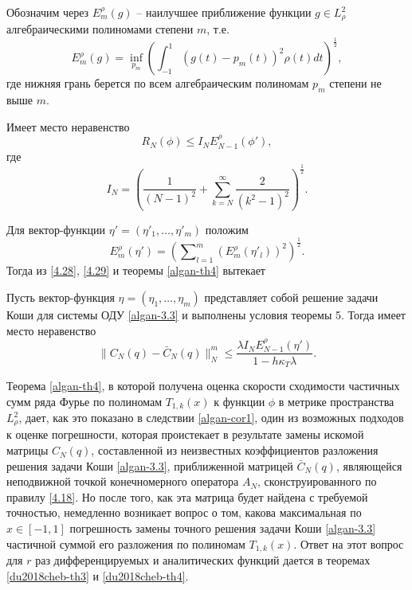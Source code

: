 Обозначим через $E^\rho_ m(g)$ -- наилучшее приближение функции $g\in L^2_\rho$ алгебраическими полиномами степени $m$, т.е.
$$
 E^\rho_ m(g)=\inf_{p_m}\left(\int_{-1}^1(g(t)- p_m(t))^2 \rho(t)dt\right)^\frac12,
$$
где нижняя грань берется по всем алгебраическим полиномам $p_m$ степени не выше $m$.

\begin{theorem}\label{algan-th4}
     Имеет место  неравенство
$$
R_N(\phi)\le I_NE^\rho_ {N-1}(\phi'),
$$
где
$$
I_N=\left(\frac{1}{(N-1)^2}+\sum_{k=N}^{\infty}\frac{2}{(k^2-1)^2}\right)^\frac12.
 $$
\end{theorem}

Для вектор-функции $\eta'=(\eta'_1,\ldots,\eta'_m)$ положим
$$
E^\rho_ m(\eta')=\left(\sum\nolimits_{l=1}^m (E^\rho_ m(\eta'_l))^2\right)^\frac12.
$$
Тогда из \eqref{4.28}, \eqref{4.29} и теоремы \ref{algan-th4} вытекает
\begin{corollary}\label{algan-cor1}
  Пусть вектор-функция $\eta=(\eta_1,\ldots,\eta_m)$ представляет собой решение задачи Коши для системы ОДУ \eqref{algan-3.3} и выполнены условия теоремы 5. Тогда имеет место неравенство
$$
\|C_N(q)-\bar C_N(q)\|_N^m\le \frac{\lambda I_NE^\rho_{N-1}(\eta') }{1-h\kappa_T\lambda}.
$$
  \end{corollary}

Теорема \ref{algan-th4}, в которой получена оценка скорости сходимости частичных сумм  ряда Фурье по полиномам  $T_{1,k}(x)$ к функции $\phi$ в метрике пространства $L^2_\rho$, дает, как это показано в следствии \ref{algan-cor1}, один из возможных подходов к оценке погрешности, которая проистекает в результате замены искомой матрицы $C_N(q)$, составленной из неизвестных коэффициентов  разложения решения задачи Коши \eqref{algan-3.3}, приближенной матрицей $\bar C_N(q)$, являющейся неподвижной точкой конечномерного оператора $A_N$, сконструированного по правилу \eqref{4.18}. Но после того, как эта матрица будет  найдена с требуемой точностью, немедленно возникает вопрос о том, какова максимальная по $x\in[-1,1]$ погрешность замены точного решения  задачи Коши \eqref{algan-3.3} частичной суммой его разложения по полиномам $T_{1,k}(x)$. Ответ на этот вопрос для $r$ раз дифференцируемых и аналитических функций дается в теоремах \ref{du2018cheb-th3} и \ref{du2018cheb-th4}. 